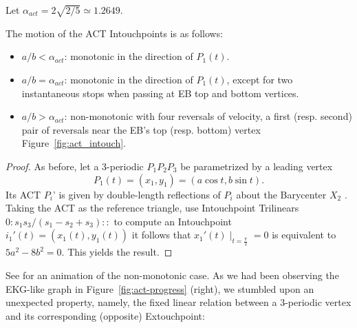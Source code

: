
Let
$\alpha_{act}=2\sqrt{2/5} \simeq 1.2649$.

\begin{proposition}
The motion of the ACT Intouchpoints is as follows:

\begin{itemize}
    \item $a/b<\alpha_{act}$: monotonic in the direction of $P_1(t)$.
    \item $a/b=\alpha_{act}$: monotonic in the direction of $P_1(t)$, except for two instantaneous stops when passing at EB top and bottom vertices.
    \item $a/b>\alpha_{act}$:  non-monotonic with four reversals of velocity, a first (resp. second) pair of reversals near the EB's top (resp. bottom) vertex Figure~\ref{fig:act_intouch}.
\end{itemize}
\end{proposition}

\begin{proof}
 
As before, let a 3-periodic $P_1P_2P_3$ be parametrized by a leading vertex $$P_1(t)= (x_1, y_1) = (a\cos t, b\sin t).$$ 
%
Its ACT $P_i$' is given by double-length reflections of $P_i$ about the Barycenter $X_2$ \cite{mw}. Taking the ACT as the reference triangle, use Intouchpoint Trilinears $0:s_1s_3/(s_1-s_2+s_3)::$ \cite[Contact Triangle]{mw} to compute an Intouchpoint $i_1'(t)=(x_1(t),y_1(t))$ it follows that
$x_1'(t)\mid_{t=\frac{\pi}{2}}=0 $ is equivalent to $5 a^2-8b^2 =0$. This yields the result. 
\end{proof}

\noindent See \cite[PL\#09]{reznik2019-playlist-math-intelligencer} for an animation of the non-monotonic case. As we had been observing the EKG-like graph in Figure~\ref{fig:act-progress} (right), we stumbled upon an unexpected property, namely, the fixed linear relation between a 3-periodic vertex and its corresponding (opposite) Extouchpoint: 

